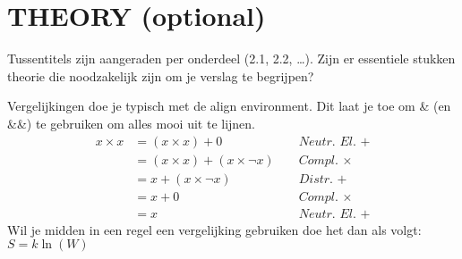 \section{THEORY (optional)}
Tussentitels zijn aangeraden per onderdeel (2.1, 2.2, \dots).
Zijn er essentiele stukken theorie die noodzakelijk zijn om je verslag te begrijpen?

Vergelijkingen doe je typisch met de align environment.
Dit laat je toe om \& (en \&\&) te gebruiken om alles mooi uit te lijnen.
    \begin{align}
    x \times x   &= (x \times x) + 0  &&\textit{ Neutr. El. }+\\
            &= (x \times x) + (x \times \neg x) && \textit{ Compl. }\times \\
            &= x + (x \times \neg x) && \textit{ Distr. }+ \\
            &= x + 0 && \textit{ Compl. }\times\\
            &= x && \textit{ Neutr. El. }+
    \end{align}
Wil je midden in een regel een vergelijking gebruiken doe het dan als volgt: $S = k\ln(W)$